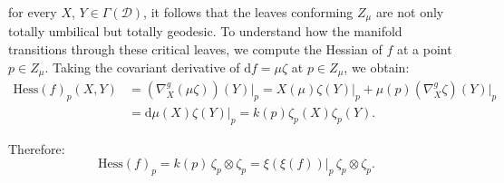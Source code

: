 \documentclass[10pt,a4paper,twoside,reqno]{amsart}
\theoremstyle{plain}
\theoremstyle{definition}
\theoremstyle{remark}
\def\dd{\mathrm{d}}
\def\cD{\mathcal{D}}
\def\dd{\mathrm{d}}
\begin{document}
for every $X$, $Y\in \Gamma(\cD)$, it follows that the leaves conforming $Z_{\mu}$ are not only totally umbilical but totally geodesic. To understand how the manifold transitions through these critical leaves, we compute the Hessian of $f$ at a point $p \in Z_\mu$. Taking the covariant derivative of $\dd f = \mu\zeta$ at $p\in Z_{\mu}$, we obtain:
\begin{align*}
\mathrm{Hess}(f)_p (X,Y) &= (\nabla_X^g(\mu\zeta))(Y)\vert_p = X(\mu)\zeta(Y)\vert_p + \mu(p)(\nabla_X^g \zeta)(Y) \vert_p \\
&= \dd\mu (X) \zeta(Y)\vert_p  = k(p) \zeta_p (X) \zeta_p (Y).
\end{align*}

Therefore:
\begin{equation*}
\mathrm{Hess}(f)_p = k(p) \, \zeta_p \otimes \zeta_p = \xi(\xi(f))\vert_p\, \zeta_p \otimes \zeta_p.
\end{equation*}
\end{document}

